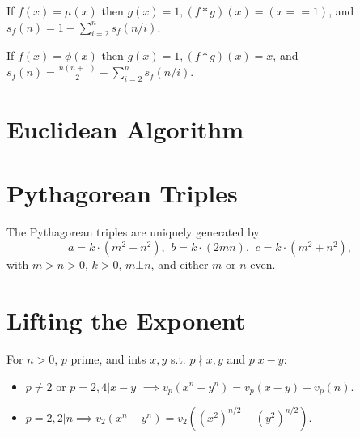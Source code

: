     If $f(x)=\mu(x)$ then $g(x)=1, (f*g)(x)=(x == 1)$, and $s_f(n)=1-\sum_{i=2}^ns_f(n/i)$.

    If $f(x)=\phi(x)$ then $g(x)=1, (f*g)(x)=x$, and $s_f(n)=\frac{n(n+1)}{2}-\sum_{i=2}^ns_f(n/i).$


	\begin{comment}
	Let $s(x)=\sum_{i=1}^x\phi(i).$ Then 
	$$s(n)=\frac{n(n+1)}{2}-\sum_{i=2}^ns\left(\left\lfloor\frac{n}{i}\right\rfloor\right)$$
	can be computed in faster than $\Theta(n)$.
	\end{comment}
	

\section{Euclidean Algorithm}

\begin{comment}
	\subsection{Bézout's identity}
	For $a \neq $, $b \neq 0$, then $d=\gcd(a,b)$ is the smallest positive integer for which there are integer solutions to
	$$ax+by=d$$
	If $(x,y)$ is one solution, then all solutions are given by
	$$\left(x+\frac{kb}{\gcd(a,b)}, y-\frac{ka}{\gcd(a,b)}\right), \quad k\in\mathbb{Z}$$
\end{comment}

	
\section{Pythagorean Triples}
	 The Pythagorean triples are uniquely generated by
	 \[ a=k\cdot (m^{2}-n^{2}),\ \,b=k\cdot (2mn),\ \,c=k\cdot (m^{2}+n^{2}), \]
	 with $m > n > 0$, $k > 0$, $m \bot n$, and either $m$ or $n$ even.

\section{Lifting the Exponent}

For $n>0$, $p$ prime, and ints $x,y$ s.t. $p\nmid x,y$ and $p|x-y$:


\begin{itemize}
\item $p\neq 2$ or $p=2, 4|x-y$ $\implies v_p(x^n - y^n) = v_p(x - y) + v_p(n)$.
\item $p=2, 2|n \implies v_2(x^n-y^n)=v_2((x^2)^{n/2}-(y^2)^{n/2})$.
\end{itemize}

